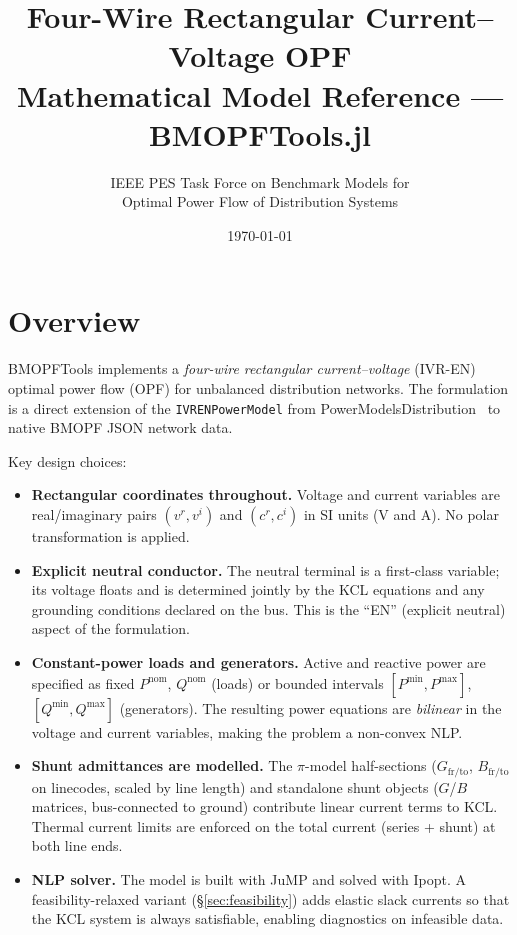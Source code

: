 \documentclass[11pt,a4paper]{article}
\title{\textbf{Four-Wire Rectangular Current--Voltage OPF}\\[4pt]
       \large Mathematical Model Reference --- BMOPFTools.jl}
\author{IEEE PES Task Force on Benchmark Models for\\
        Optimal Power Flow of Distribution Systems}
\date{\today}
\begin{document}
\maketitle
\tableofcontents
\bigskip

\section{Overview}

BMOPFTools implements a \emph{four-wire rectangular current--voltage} (IVR-EN)
optimal power flow (OPF) for unbalanced distribution networks.  The formulation
is a direct extension of the \texttt{IVRENPowerModel} from
PowerModelsDistribution~\cite{PowerModelsDistribution2022} to native BMOPF JSON
network data.

Key design choices:
\begin{itemize}
  \item \textbf{Rectangular coordinates throughout.}  Voltage and current
        variables are real/imaginary pairs $(v^r, v^i)$ and $(c^r, c^i)$ in
        SI units (V and A).  No polar transformation is applied.

  \item \textbf{Explicit neutral conductor.}  The neutral terminal is a
        first-class variable; its voltage floats and is determined jointly by
        the KCL equations and any grounding conditions declared on the bus.
        This is the ``EN'' (explicit neutral) aspect of the formulation.

  \item \textbf{Constant-power loads and generators.}  Active and reactive
        power are specified as fixed $P^\text{nom}$, $Q^\text{nom}$ (loads) or
        bounded intervals $[P^\text{min}, P^\text{max}]$,
        $[Q^\text{min}, Q^\text{max}]$ (generators).  The resulting power
        equations are \emph{bilinear} in the voltage and current variables,
        making the problem a non-convex NLP.

  \item \textbf{Shunt admittances are modelled.}  The $\pi$-model half-sections
        ($G_\text{fr/to}$, $B_\text{fr/to}$ on linecodes, scaled by line length)
        and standalone shunt objects ($G$/$B$ matrices, bus-connected to ground)
        contribute linear current terms to KCL.  Thermal current limits are
        enforced on the total current (series + shunt) at both line ends.

  \item \textbf{NLP solver.}  The model is built with JuMP and solved with
        Ipopt.  A feasibility-relaxed variant (\S\ref{sec:feasibility}) adds
        elastic slack currents so that the KCL system is always satisfiable,
        enabling diagnostics on infeasible data.
\end{itemize}
\end{document}
